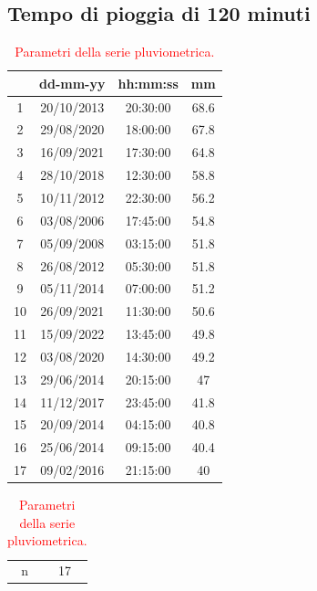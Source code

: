 \subsection{Tempo di pioggia di 120 minuti}

\begin{table}[H]
    \caption*{Evento pluviometrico di 120 minuti.}
    \begin{minipage}{.5\linewidth}
      \caption{\textcolor{red}{Campione della serie pluviometrica.}}
      \centering
        \begin{tabular}{cccc}
            \toprule
            & dd-mm-yy   & hh:mm:ss & mm \\
         \midrule
         1  & 20/10/2013 & 20:30:00 & 68.6 \\
         2  & 29/08/2020 & 18:00:00 & 67.8 \\
         3  & 16/09/2021 & 17:30:00 & 64.8 \\
         4  & 28/10/2018 & 12:30:00 & 58.8 \\
         5  & 10/11/2012 & 22:30:00 & 56.2 \\
         6  & 03/08/2006 & 17:45:00 & 54.8 \\
         7  & 05/09/2008 & 03:15:00 & 51.8 \\
         8  & 26/08/2012 & 05:30:00 & 51.8 \\
         9  & 05/11/2014 & 07:00:00 & 51.2 \\
         10 & 26/09/2021 & 11:30:00 & 50.6 \\
         11 & 15/09/2022 & 13:45:00 & 49.8 \\
         12 & 03/08/2020 & 14:30:00 & 49.2 \\
         13 & 29/06/2014 & 20:15:00 & 47   \\
         14 & 11/12/2017 & 23:45:00 & 41.8 \\
         15 & 20/09/2014 & 04:15:00 & 40.8 \\
         16 & 25/06/2014 & 09:15:00 & 40.4 \\
         17 & 09/02/2016 & 21:15:00 & 40   \\
         \bottomrule  
        \end{tabular}
    \end{minipage}%
    \begin{minipage}{.5\linewidth}
      \centering
        \caption{\textcolor{red}{Parametri della serie pluviometrica.}}
        \begin{tabular}{cc}
            \toprule
            n        &     17    \\

\end{tabular}
\end{minipage}
\end{table}
